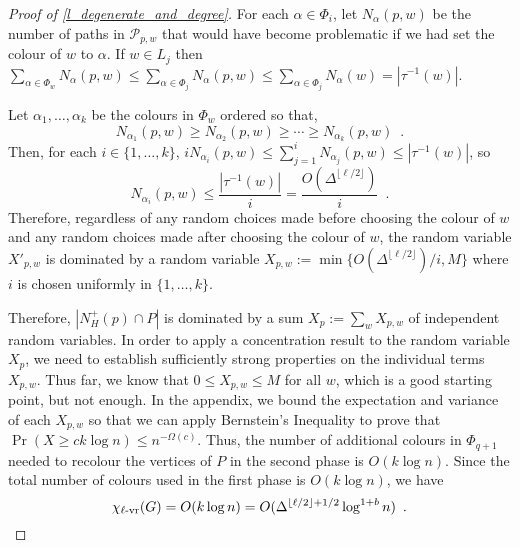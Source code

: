 \documentclass{patmorin}
\newcommand{\rn}[1]{\chi_{\operatorname{#1-vr}}}
\newcommand{\trn}{\chi_{\mathrm{us}}}
\newcommand{\lrn}{\rn{\ell}}
\begin{document}
\begin{proof}[Proof of \cref{l_degenerate_and_degree}]
  For each $\alpha\in\Phi_i$, let $N_\alpha(p,w)$ be the number of paths in $\mathcal{P}_{p,w}$ that would have become problematic if we had set the colour of $w$ to $\alpha$. If $w\in L_j$ then $\sum_{\alpha\in\Phi_w} N_\alpha(p,w) \le \sum_{\alpha\in\Phi_j} N_\alpha(p,w) \le \sum_{\alpha\in\Phi_j} N_\alpha(w) = |\tau^{-1}(w)|$.

  Let $\alpha_1,\ldots,\alpha_k$ be the colours in $\Phi_w$ ordered so that,
  \[
    N_{\alpha_1}(p,w) \ge N_{\alpha_2}(p,w) \ge\cdots\ge N_{\alpha_k}(p,w) \enspace .
  \]
  Then, for each $i\in\{1,\ldots,k\}$, $iN_{\alpha_i}(p,w)\le\sum_{j=1}^i N_{\alpha_j}(p,w) \le |\tau^{-1}(w)|$, so
  \[
    N_{\alpha_i}(p,w)\le \frac{|\tau^{-1}(w)|}{i}=\frac{O(\Delta^{\lfloor\ell/2\rfloor})}{i} \enspace .
  \]
  Therefore, regardless of any random choices made before choosing the colour of $w$ and any random choices made after choosing the colour of $w$, the random variable $X'_{p,w}$ is dominated by a random variable $X_{p,w}:=\min\{O(\Delta^{\lfloor\ell/2\rfloor})/i,M\}$ where $i$ is chosen uniformly in $\{1,\ldots,k\}$.

  Therefore, $|N_H^+(p)\cap P|$ is dominated by a sum $X_p:=\sum_{w} X_{p,w}$ of independent random variables.  In order to apply a concentration result to the random variable $X_p$, we need to  establish sufficiently strong properties on the individual terms $X_{p,w}$.  Thus far, we know that $0\le X_{p,w}\le M$ for all $w$, which is a good starting point, but not enough.  In the appendix, we bound the expectation and variance of each $X_{p,w}$ so that we can apply Bernstein's Inequality to prove that $\Pr(X\ge ck\log n)\le n^{-\Omega(c)}$.  Thus, the number of additional colours in $\Phi_{q+1}$ needed to recolour the vertices of $P$ in the second phase is $O(k\log n)$.  Since the total number of colours used in the first phase is $O(k\log n)$, we have
  \[
    \lrn(G) = O(k \log n) = O(\Delta^{\lfloor\ell/2\rfloor+1/2}\log^{1+b} n) \enspace . \qedhere
  \]
\end{proof}
%





\end{document}
